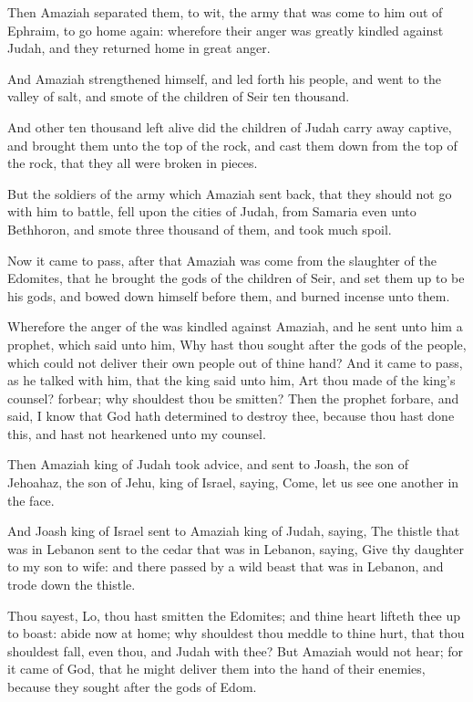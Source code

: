 \Verse Then Amaziah separated them, to wit, the army that was come to him out of Ephraim, to go home again: wherefore their anger was greatly kindled against Judah, and they returned home in great anger.

\Verse And Amaziah strengthened himself, and led forth his people, and went to the valley of salt, and smote of the children of Seir ten thousand.

\Verse And other ten thousand left alive did the children of Judah carry away captive, and brought them unto the top of the rock, and cast them down from the top of the rock, that they all were broken in pieces.

\Verse But the soldiers of the army which Amaziah sent back, that they should not go with him to battle, fell upon the cities of Judah, from Samaria even unto Bethhoron, and smote three thousand of them, and took much spoil.

\Verse Now it came to pass, after that Amaziah was come from the slaughter of the Edomites, that he brought the gods of the children of Seir, and set them up to be his gods, and bowed down himself before them, and burned incense unto them.

\Verse Wherefore the anger of the \LORD was kindled against Amaziah, and he sent unto him a prophet, which said unto him, Why hast thou sought after the gods of the people, which could not deliver their own people out of thine hand?  \Verse And it came to pass, as he talked with him, that the king said unto him, Art thou made of the king's counsel?  forbear; why shouldest thou be smitten? Then the prophet forbare, and said, I know that God hath determined to destroy thee, because thou hast done this, and hast not hearkened unto my counsel.

\Verse Then Amaziah king of Judah took advice, and sent to Joash, the son of Jehoahaz, the son of Jehu, king of Israel, saying, Come, let us see one another in the face.

\Verse And Joash king of Israel sent to Amaziah king of Judah, saying, The thistle that was in Lebanon sent to the cedar that was in Lebanon, saying, Give thy daughter to my son to wife: and there passed by a wild beast that was in Lebanon, and trode down the thistle.

\Verse Thou sayest, Lo, thou hast smitten the Edomites; and thine heart lifteth thee up to boast: abide now at home; why shouldest thou meddle to thine hurt, that thou shouldest fall, even thou, and Judah with thee?  \Verse But Amaziah would not hear; for it came of God, that he might deliver them into the hand of their enemies, because they sought after the gods of Edom.

